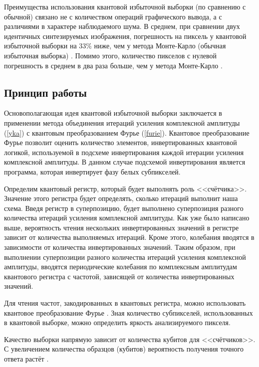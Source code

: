 Преимущества использования квантовой избыточной выборки (по сравнению с обычной) связано не с количеством операций графического вывода, а с различиями в характере наблюдаемого шума. В среднем, при сравнении двух идентичных синтезируемых изображения, погрешность на пиксель у квантовой избыточной выборки на 33\% ниже, чем у метода Монте-Карло (обычная избыточная выборка) \cite{PQC-prcnt}. Помимо этого, количество пикселов с нулевой погрешность в среднем в два раза больше, чем у метода Монте-Карло \cite{PQC-prcnt}.

\subsection{Принцип работы}

Основополагающая идея квантовой избыточной выборки заключается в применении метода объединения итераций усиления комплексной амплитуды (\ref{yka}) с квантовым преобразованием Фурье (\ref{furie}). Квантовое преобразование Фурье позволит оценить количество элементов, инвертированных квантовой логикой, используемой в подсхеме инвертирования каждой итерации усиления комплексной амплитуды. В данном случае подсхемой инвертирования является программа, которая инвертирует фазу белых субпикселей.

Определим квантовый регистр, который будет выполнять роль <<счётчика>>. Значение этого регистра будет определять, сколько итераций выполнит наша схема. Введя регистр в суперпозицию, будет выполнено суперпозиция разного количества итераций усиления комплексной амплитуды. Как уже было написано выше, вероятность чтения нескольких инвертированных значений в регистре зависит от количества выполняемых итераций. Кроме этого, колебания вводятся в зависимости от количества инвертированных значений. Таким образом, при выполнении суперпозиции разного количества итераций усиления комплексной амплитуды, вводятся периодические колебания по комплексным амплитудам квантового регистра с частотой, зависящей от количества инвертированных значений.

Для чтения частот, закодированных в квантовых регистра, можно использовать квантовое преобразование Фурье \cite{PQC-fourier}. Зная количество субпикселей, использованных в квантовой выборке, можно определить яркость анализируемого пикселя.

Качество выборки напрямую зависит от количества кубитов для <<счётчиков>>. С увеличением количества образцов (кубитов) вероятность получения точного ответа растёт \cite{PQC-qbits}.


